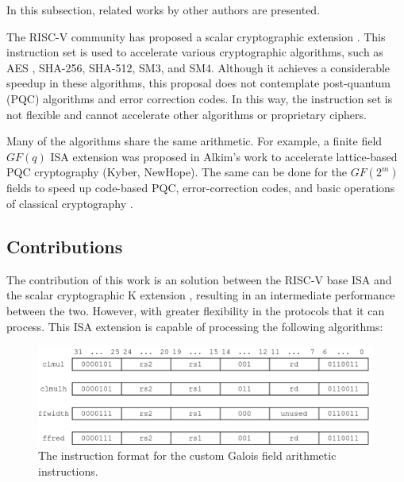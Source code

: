 In this subsection, related works by other authors are presented.

The RISC-V community has proposed a scalar cryptographic extension \cite{zehrisc}. This instruction set 
is used to accelerate various cryptographic algorithms, such as AES \cite{Marshall_Newell_Page_Saarinen_Wolf_2020}, SHA-256, SHA-512, SM3, and SM4. 
Although it achieves a considerable speedup in these algorithms, this proposal does not contemplate 
post-quantum (PQC) algorithms and error correction codes. In this way, the instruction set is not flexible 
and cannot accelerate other algorithms or proprietary ciphers.

Many of the algorithms share the same arithmetic. For example, a finite field $GF(q)$ ISA extension 
was proposed in Alkim's \cite{Alkim_Evkan_Lahr_Niederhagen_Petri_2020} work to accelerate lattice-based PQC 
cryptography (Kyber, NewHope). The same can be done for the $GF(2^m)$ fields to speed up code-based PQC, 
error-correction codes, and basic operations of classical cryptography \cite{10.1145/944645.944659}.

\subsection{Contributions}


The contribution of this work is an solution between the RISC-V base ISA and the scalar cryptographic K extension \cite{zehrisc}, resulting in an 
intermediate performance between the two. However, with greater flexibility in the protocols that it can process. This ISA extension is capable of 
processing the following algorithms:

\begin{figure}[tp]
    \centering
    \includegraphics[width=0.8\linewidth]{img/instr.png}
    \caption{The instruction format for the custom Galois field arithmetic instructions.}
    \label{fig:instr}
\end{figure}


